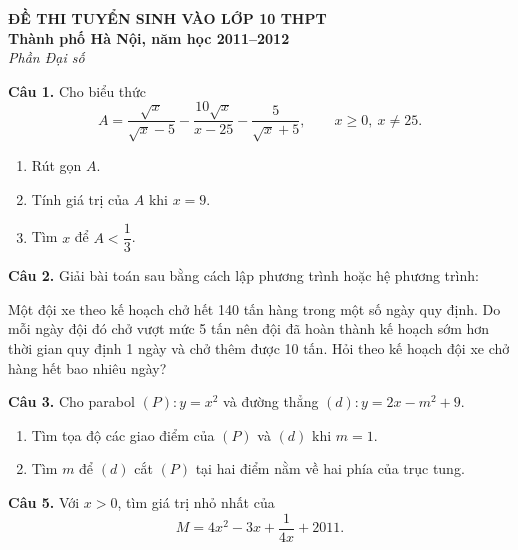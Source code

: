 \documentclass[12pt,a4paper]{article}
\begin{document}
\begin{center}
{\Large\bfseries ĐỀ THI TUYỂN SINH VÀO LỚP 10 THPT}\\
{\bfseries Thành phố Hà Nội, năm học 2011--2012}\\
{\itshape Phần Đại số}
\end{center}

\textbf{Câu 1.} Cho biểu thức
\[
A=\frac{\sqrt{x}}{\sqrt{x}-5}
-\frac{10\sqrt{x}}{x-25}
-\frac5{\sqrt{x}+5},
\qquad x\ge0,\ x\ne25.
\]
\begin{enumerate}[label=\alph*)]
\item Rút gọn $A$.
\item Tính giá trị của $A$ khi $x=9$.
\item Tìm $x$ để $A<\dfrac13$.
\end{enumerate}

\textbf{Câu 2.} Giải bài toán sau bằng cách lập phương trình hoặc hệ phương trình:

Một đội xe theo kế hoạch chở hết 140 tấn hàng trong một số ngày quy định. Do mỗi ngày đội đó chở vượt mức 5 tấn nên đội đã hoàn thành kế hoạch sớm hơn thời gian quy định 1 ngày và chở thêm được 10 tấn. Hỏi theo kế hoạch đội xe chở hàng hết bao nhiêu ngày?

\textbf{Câu 3.} Cho parabol $(P):y=x^2$ và đường thẳng $(d):y=2x-m^2+9$.
\begin{enumerate}[label=\alph*)]
\item Tìm tọa độ các giao điểm của $(P)$ và $(d)$ khi $m=1$.
\item Tìm $m$ để $(d)$ cắt $(P)$ tại hai điểm nằm về hai phía của trục tung.
\end{enumerate}

\textbf{Câu 5.} Với $x>0$, tìm giá trị nhỏ nhất của
\[
M=4x^2-3x+\frac1{4x}+2011.
\]
\end{document}
